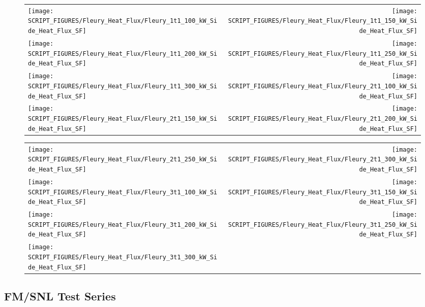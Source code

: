 \begin{figure}[!ht]
\begin{tabular*}{\textwidth}{l@{\extracolsep{\fill}}r}
\texttt{[image: SCRIPT\_FIGURES/Fleury\_Heat\_Flux/Fleury\_1t1\_100\_kW\_Side\_Heat\_Flux\_SF]} &
\texttt{[image: SCRIPT\_FIGURES/Fleury\_Heat\_Flux/Fleury\_1t1\_150\_kW\_Side\_Heat\_Flux\_SF]} \\
\texttt{[image: SCRIPT\_FIGURES/Fleury\_Heat\_Flux/Fleury\_1t1\_200\_kW\_Side\_Heat\_Flux\_SF]} &
\texttt{[image: SCRIPT\_FIGURES/Fleury\_Heat\_Flux/Fleury\_1t1\_250\_kW\_Side\_Heat\_Flux\_SF]} \\
\texttt{[image: SCRIPT\_FIGURES/Fleury\_Heat\_Flux/Fleury\_1t1\_300\_kW\_Side\_Heat\_Flux\_SF]} &
\texttt{[image: SCRIPT\_FIGURES/Fleury\_Heat\_Flux/Fleury\_2t1\_100\_kW\_Side\_Heat\_Flux\_SF]} \\
\texttt{[image: SCRIPT\_FIGURES/Fleury\_Heat\_Flux/Fleury\_2t1\_150\_kW\_Side\_Heat\_Flux\_SF]} &
\texttt{[image: SCRIPT\_FIGURES/Fleury\_Heat\_Flux/Fleury\_2t1\_200\_kW\_Side\_Heat\_Flux\_SF]}
\end{tabular*}
\end{figure}

\begin{figure}[!ht]
\begin{tabular*}{\textwidth}{l@{\extracolsep{\fill}}r}
\texttt{[image: SCRIPT\_FIGURES/Fleury\_Heat\_Flux/Fleury\_2t1\_250\_kW\_Side\_Heat\_Flux\_SF]} &
\texttt{[image: SCRIPT\_FIGURES/Fleury\_Heat\_Flux/Fleury\_2t1\_300\_kW\_Side\_Heat\_Flux\_SF]} \\
\texttt{[image: SCRIPT\_FIGURES/Fleury\_Heat\_Flux/Fleury\_3t1\_100\_kW\_Side\_Heat\_Flux\_SF]} &
\texttt{[image: SCRIPT\_FIGURES/Fleury\_Heat\_Flux/Fleury\_3t1\_150\_kW\_Side\_Heat\_Flux\_SF]} \\
\texttt{[image: SCRIPT\_FIGURES/Fleury\_Heat\_Flux/Fleury\_3t1\_200\_kW\_Side\_Heat\_Flux\_SF]} &
\texttt{[image: SCRIPT\_FIGURES/Fleury\_Heat\_Flux/Fleury\_3t1\_250\_kW\_Side\_Heat\_Flux\_SF]} \\
\texttt{[image: SCRIPT\_FIGURES/Fleury\_Heat\_Flux/Fleury\_3t1\_300\_kW\_Side\_Heat\_Flux\_SF]}
\end{tabular*}
\end{figure}

\clearpage

\subsection{FM/SNL Test Series}

